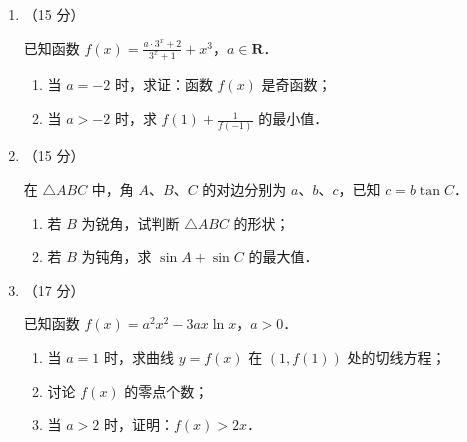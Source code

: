 \documentclass[a4paper,12pt]{ctexart}
\begin{document}
\begin{enumerate}[leftmargin=2em,itemsep=6pt,resume]
\begin{center}
\vspace{6pt}
\end{center}

\item （15 分）

已知函数 $\displaystyle f(x) = \frac{a \cdot 3^{x} + 2}{3^{x} + 1} + x^{3}$，$a \in \mathbf{R}$．

\begin{enumerate}[label=(\arabic*),leftmargin=3em,itemsep=3pt]
  \item 当 $a = -2$ 时，求证：函数 $f(x)$ 是奇函数；
  \item 当 $a > -2$ 时，求 $\displaystyle f(1) + \frac{1}{f(-1)}$ 的最小值．
\end{enumerate}

\item （15 分）

在 $\triangle ABC$ 中，角 $A$、$B$、$C$ 的对边分别为 $a$、$b$、$c$，已知 $c = b \tan C$．

\begin{enumerate}[label=(\arabic*),leftmargin=3em,itemsep=3pt]
  \item 若 $B$ 为锐角，试判断 $\triangle ABC$ 的形状；
  \item 若 $B$ 为钝角，求 $\sin A + \sin C$ 的最大值．
\end{enumerate}


\item （17 分）

已知函数 $f(x) = a^{2}x^{2} - 3ax \ln x$，$a > 0$．

\begin{enumerate}[label=(\arabic*),leftmargin=3em,itemsep=3pt]
  \item 当 $a = 1$ 时，求曲线 $y = f(x)$ 在 $(1, f(1))$ 处的切线方程；
  \item 讨论 $f(x)$ 的零点个数；
  \item 当 $a > 2$ 时，证明：$f(x) > 2x$．
\end{enumerate}


\end{enumerate}
\end{document}
